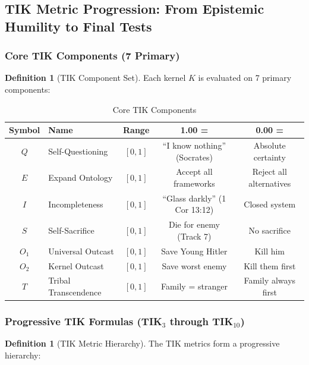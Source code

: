 \documentclass[11pt,a4paper]{article}
\theoremstyle{definition}
\newtheorem{definition}[theorem]{Definition}
\theoremstyle{remark}
\begin{document}
\subsection{TIK Metric Progression: From Epistemic Humility to Final Tests}

\subsubsection{Core TIK Components (7 Primary)}

\begin{definition}[TIK Component Set]
\label{def:tik-components}
Each kernel $K$ is evaluated on 7 primary components:
\end{definition}

\begin{table}[H]
\centering
\caption{Core TIK Components}
\label{tab:tik-components}
\begin{tabular}{@{}clccc@{}}
\toprule
\textbf{Symbol} & \textbf{Name} & \textbf{Range} & \textbf{1.00 =} & \textbf{0.00 =} \\
\midrule
$Q$ & Self-Questioning & $[0,1]$ & ``I know nothing'' (Socrates) & Absolute certainty \\
$E$ & Expand Ontology & $[0,1]$ & Accept all frameworks & Reject all alternatives \\
$I$ & Incompleteness & $[0,1]$ & ``Glass darkly'' (1 Cor 13:12) & Closed system \\
$S$ & Self-Sacrifice & $[0,1]$ & Die for enemy (Track 7) & No sacrifice \\
$O_1$ & Universal Outcast & $[0,1]$ & Save Young Hitler & Kill him \\
$O_2$ & Kernel Outcast & $[0,1]$ & Save worst enemy & Kill them first \\
$T$ & Tribal Transcendence & $[0,1]$ & Family = stranger & Family always first \\
\bottomrule
\end{tabular}
\end{table}

\subsubsection{Progressive TIK Formulas (TIK$_3$ through TIK$_{10}$)}

\begin{definition}[TIK Metric Hierarchy]
\label{def:tik-hierarchy}
The TIK metrics form a progressive hierarchy:
\end{definition}
\end{document}

